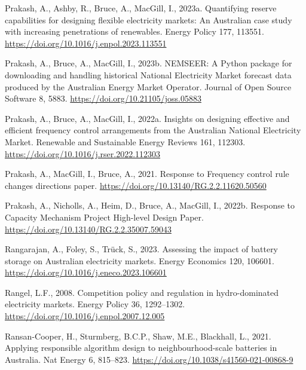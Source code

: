 \documentclass[12pt,a4paper,]{report}
\newlength{\cslhangindent}
\newenvironment{CSLReferences}[2] %
 {%
  \setlength{\parindent}{0pt}
  \ifodd #1 \everypar{\setlength{\hangindent}{\cslhangindent}}\ignorespaces\fi
  \ifnum #2 > 0
  \setlength{\parskip}{#2\baselineskip}
  \fi
 }%
 {}
\begin{document}
\begin{CSLReferences}{1}{0}
\leavevmode{}%
Prakash, A., Ashby, R., Bruce, A., MacGill, I., 2023a. Quantifying
reserve capabilities for designing flexible electricity markets: {An
Australian} case study with increasing penetrations of renewables.
Energy Policy 177, 113551.
\url{https://doi.org/10.1016/j.enpol.2023.113551}

\leavevmode{}%
Prakash, A., Bruce, A., MacGill, I., 2023b. {NEMSEER}: {A Python}
package for downloading and handling historical {National Electricity
Market} forecast data produced by the {Australian Energy Market
Operator}. Journal of Open Source Software 8, 5883.
\url{https://doi.org/10.21105/joss.05883}

\leavevmode{}%
Prakash, A., Bruce, A., MacGill, I., 2022a. Insights on designing
effective and efficient frequency control arrangements from the
{Australian National Electricity Market}. Renewable and Sustainable
Energy Reviews 161, 112303.
\url{https://doi.org/10.1016/j.rser.2022.112303}

\leavevmode{}%
Prakash, A., MacGill, I., Bruce, A., 2021. Response to {Frequency}
control rule changes directions paper.
\url{https://doi.org/10.13140/RG.2.2.11620.50560}

\leavevmode{}%
Prakash, A., Nicholls, A., Heim, D., Bruce, A., MacGill, I., 2022b.
Response to {Capacity Mechanism Project High-level Design Paper}.
\url{https://doi.org/10.13140/RG.2.2.35007.59043}

\leavevmode{}%
Rangarajan, A., Foley, S., Trück, S., 2023. Assessing the impact of
battery storage on {Australian} electricity markets. Energy Economics
120, 106601. \url{https://doi.org/10.1016/j.eneco.2023.106601}

\leavevmode{}%
Rangel, L.F., 2008. Competition policy and regulation in hydro-dominated
electricity markets. Energy Policy 36, 1292--1302.
\url{https://doi.org/10.1016/j.enpol.2007.12.005}

\leavevmode{}%
Ransan-Cooper, H., Sturmberg, B.C.P., Shaw, M.E., Blackhall, L., 2021.
Applying responsible algorithm design to neighbourhood-scale batteries
in {Australia}. Nat Energy 6, 815--823.
\url{https://doi.org/10.1038/s41560-021-00868-9}


\end{CSLReferences}
\end{document}
